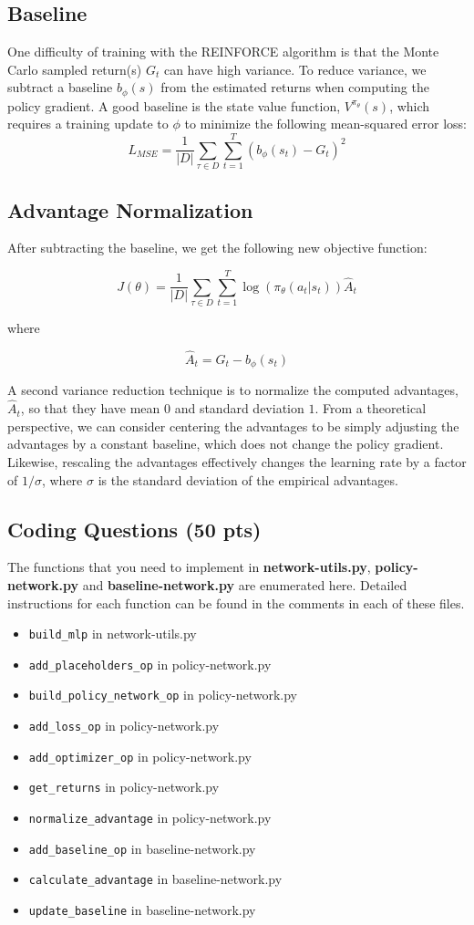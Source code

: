 \documentclass{article}
\begin{document}
\subsection{Baseline}
One difficulty of training with the REINFORCE algorithm is that the Monte Carlo sampled return(s) $G_t$ can have high variance. To reduce variance, we subtract a baseline $b_{\phi}(s)$ from the estimated returns when computing the policy gradient. A good baseline is the state value function, $V^{\pi_\theta}(s)$, which requires a training update to $\phi$ to minimize the following mean-squared error loss:
\[ L_{MSE} = \frac{1}{|D|} \sum_{\tau \in D} \sum_{t=1}^T (b_{\phi}(s_t) - G_t)^2\]
\subsection{Advantage Normalization}

After subtracting the baseline, we get the following new objective function:

\[ J(\theta) = \frac{1}{|D|} \sum_{\tau \in D} \sum_{t=1}^T \log(\pi_\theta(a_t|s_t)) \hat{A}_t \]

where

\[\hat{A}_t=G_t - b_{\phi}(s_t)\]

A second variance reduction technique is to normalize the computed advantages, $\hat{A}_t$, so that they have mean $0$ and standard deviation $1$. From a theoretical perspective, we can consider centering the advantages to be simply adjusting the advantages by a constant baseline, which does not change the policy gradient. Likewise, rescaling the advantages effectively changes the learning rate by a factor of $1/\sigma$, where $\sigma$ is the standard deviation of the empirical advantages.

\subsection{Coding Questions (50 pts)}
The functions that you need to implement in \textbf{network-utils.py}, \textbf{policy-network.py} and \textbf{baseline-network.py} are enumerated here. Detailed instructions for each function can be found in the comments in each of these files.
\begin{itemize}
\item\texttt{build\_mlp} in network-utils.py
\item\texttt{add\_placeholders\_op} in policy-network.py
\item\texttt{build\_policy\_network\_op} in policy-network.py
\item\texttt{add\_loss\_op} in policy-network.py
\item\texttt{add\_optimizer\_op} in policy-network.py
\item\texttt{get\_returns} in policy-network.py
\item\texttt{normalize\_advantage} in policy-network.py
\item\texttt{add\_baseline\_op} in baseline-network.py
\item\texttt{calculate\_advantage} in baseline-network.py
\item\texttt{update\_baseline} in baseline-network.py
\end{itemize}
\end{document}

